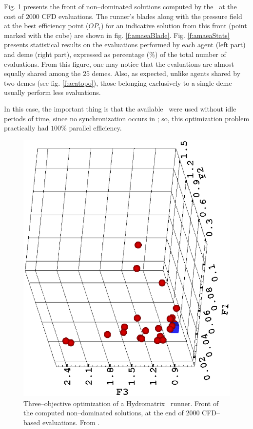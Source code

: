 \documentclass{vki_ls}
\begin{document}
Fig. \ref{f:amaeaFront} presents the front of non--dominated solutions computed by the \AMAEA\ at the cost of $2000$ CFD evaluations. The runner's blades along with the pressure field at the best efficiency point ($OP_1$) for an indicative solution from this front (point marked with the cube) are shown in fig. \ref{f:amaeaBlade}.
Fig. \ref{f:amaeaStats} presents statistical results on the evaluations performed by each agent (left part) and deme (right part), expressed as percentage (\%) of the total number of evaluations. From this figure, one may notice that the evaluations are almost equally shared among the $25$ demes. Also, as expected, unlike agents shared by two demes (see fig. \ref{f:aeatopo}), those belonging exclusively to a single deme usually perform less evaluations.

In this case, the important thing is that the available \CPUs\ were used without idle periods of time, since no synchronization occurs in \AMAEA; so, this optimization problem practically had $100\%$ parallel efficiency.

\begin{figure}
    \centering
    \includegraphics[trim=100 40 40 40,scale=0.5, angle=-90]{amaea/paretoA.eps}
    \caption{Three--objective optimization of a Hydromatrix\textregistered~
             runner. Front of the computed non--dominated solutions, 
	     at the end of 2000 CFD--based evaluations. From \cite{LTT_3_104}.}
    \label{f:amaeaFront}
\end{figure}
\end{document}
